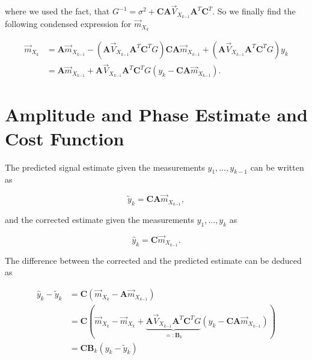 \documentclass[11pt,a4paper,twoside]{report}
\newcommand{\messF}[3]{\overrightarrow{#1}_{{#2}_{k{#3}}}}
\newcommand{\mat}[1]{\mathbf{#1}}
\begin{document}
where we used the fact, that $G^{-1} = \sigma^2 + \mat{C} \mat{A}\messF{V}{X}{-1} \mat{A}^T\mat{C}^T$. So we finally find the following condensed expression for $\messF{m}{X}{}$

\begin{align}
	\label{eq: update rule, mean vector}
	\messF{m}{X}{} &= \mat{A} \messF{m}{X}{-1} - \left(\mat{A}\messF{V}{X}{-1}\mat{A}^T \mat{C}^T G\right)\mat{C}\mat{A}\messF{m}{X}{-1} + \left(\mat{A}\messF{V}{X}{-1}\mat{A}^T\mat{C}^T G\right) y_k \\
	&= \mat{A} \messF{m}{X}{-1} + \mat{A}\messF{V}{X}{-1}\mat{A}^T\mat{C}^T G \left( y_k - \mat{C}\mat{A}\messF{m}{X}{-1} \right).
\end{align}

%


\chapter*{Amplitude and Phase Estimate and Cost Function}
The predicted signal estimate given the measurements ${y_1,...,y_{k-1}}$ can be written as

\begin{equation*}
	\tilde{y}_k = \mat{CA}\messF{m}{X}{-1},
\end{equation*}

and the corrected estimate given the measurements ${y_1,...,y_k}$ as

\begin{equation*}
	\hat{y}_k = \mat{C}\messF{m}{X}{-1}.
\end{equation*}

The difference between the corrected and the predicted estimate can be deduced as

\begin{align}
	\hat{y}_k - \tilde{y}_k &= \mat{C}\left(\messF{m}{X}{} - \mat{A}\messF{m}{X}{-1}\right) \\
	\nonumber
	&= \mat{C}\left(\messF{m}{X}{} - \messF{m}{X}{} + \underbrace{\mat{A}\messF{V}{X}{-1}\mat{A}^T\mat{C}^TG}_{=:\mat{B}_k}\left(y_k-\mat{CA}\messF{m}{X}{-1}\right)\right) \\
	\label{eq: corrected-predicted estimate}
	&= \mat{C}\mat{B}_k\left(y_k - \tilde{y}_k\right)
\end{align}
\end{document}
